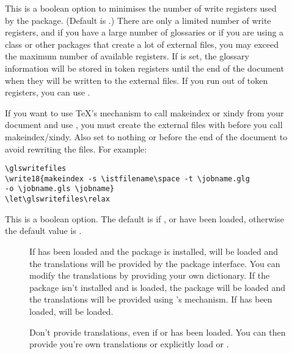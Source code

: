 \documentclass{nlctdoc}
\begin{document}
\begin{description}
\item[] This is a boolean option to minimises the
number of write registers used by the  package.
(Default is .) There are only a limited
number of write registers, and if you have a large number of
glossaries or if you are using a class or other packages that
create a lot of external files, you may exceed the maximum number
of available registers. If  is set, the glossary
information will be stored in token registers until the end of the
document when they will be written to the external files. If you run
out of token registers, you can use .

\begin{important}
If you want to use \TeX's  mechanism to call
\gls{makeindex} or \gls{xindy} from your document and use
, you must create the external files with 
 before you call \gls*{makeindex}/\gls*{xindy}. Also set
 to nothing or  before the end of the
document to avoid rewriting the files. For example:
\begin{verbatim}
\glswritefiles
\write18{makeindex -s \istfilename\space -t \jobname.glg
-o \jobname.gls \jobname}
\let\glswritefiles\relax
\end{verbatim}
\end{important}

\item[] This is a boolean option. The default is
 if ,  or 
 have been loaded, otherwise the default value is
.

  \begin{description}
  \item[{}] If  has been loaded
  and the  package is installed, 
  will be loaded and the translations will be provided by the
   package interface. You can modify the 
  translations by providing your own dictionary. If the 
   package isn't installed and  is
  loaded, the  package will 
  be loaded and the translations will be provided using 's
   mechanism. If 
   has been loaded, 
  will be loaded.

  \item[{}] Don't provide translations, even
  if  or  has been loaded. You can 
  then provide you're own translations or explicitly load 
   or .
  \end{description}


\end{description}
\end{document}
